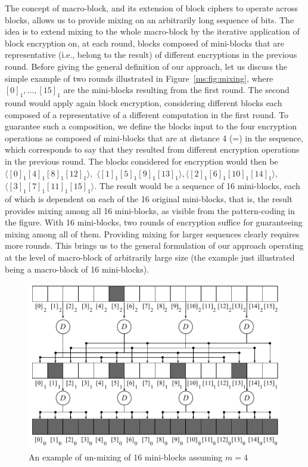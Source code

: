 The concept of macro-block, and its extension of block ciphers to operate across blocks, allows us to provide mixing on an arbitrarily long sequence of bits. %
The idea is to extend mixing to the whole macro-block by the iterative application of block encryption on, at each round, blocks composed of mini-blocks that are representative (i.e., belong to the result) of different encryptions in the previous round. Before giving the general definition of our approach, let us discuss the simple example of two rounds illustrated in Figure~\ref{ms:fig:mixing}, where $[0]_1, \ldots, [15]_1$ are the mini-blocks resulting from the first round. The second round would apply again block encryption, considering different blocks each composed of a representative of a different computation in the first round. To guarantee such a composition, we define the blocks input to the four encryption operations as composed of mini-blocks that are at distance 4 (=\mnumb) in the sequence, which corresponds to say that they resulted from different encryption operations in the previous round. The blocks considered for encryption would then be $\langle [0]_1[4]_1[8]_1[12]_1\rangle,$ $\langle [1]_1[5]_1[9]_1[13]_1\rangle,$$ \langle [2]_1[6]_1[10]_1[14]_1\rangle, $$\langle [3]_1[7]_1[11]_1[15]_1 \rangle.$ The result would be a sequence of 16 mini-blocks, each of which is dependent on each of the 16 original mini-blocks, that is, the result provides mixing among all 16 mini-blocks, as visible from the pattern-coding in the figure. With 16 mini-blocks, two rounds of encryption suffice for guaranteeing mixing among all of them. Providing mixing for larger sequences clearly requires more rounds. This brings us to the general formulation of our approach operating at the level of macro-block of arbitrarily large size (the example just illustrated being a macro-block of 16 mini-blocks).


\begin{figure}[!t]
	\centering
	\includegraphics[width=0.9\columnwidth]{figures/decrypt}
	\caption{\label{ms:fig:unmixing} An example of un-mixing of 16 mini-blocks assuming $m=4$}
\end{figure}

